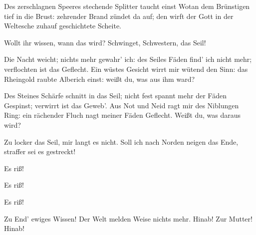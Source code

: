 \begin{drama}

Des zerschlagnen Speeres
stechende Splitter
taucht einst Wotan
dem Brünstigen tief in die Brust:
zehrender Brand zündet da auf;
den wirft der Gott in der Weltesche
zuhauf geschichtete Scheite.
 




\DieZweiteNornspeaks

Wollt ihr wissen,
wann das wird?
Schwinget, Schwestern, das Seil!
 

\DieErsteNornspeaks



Die Nacht weicht;
nichts mehr gewahr' ich:
des Seiles Fäden find' ich nicht mehr;
verflochten ist das Geflecht.
Ein wüstes Gesicht wirrt mir wütend den Sinn:
das Rheingold raubte Alberich einst:
weißt du, was aus ihm ward?
 

\DieZweiteNornspeaks



Des Steines Schärfe schnitt in das Seil;
nicht fest spannt mehr der Fäden Gespinst;
verwirrt ist das Geweb'.
Aus Not und Neid
ragt mir des Niblungen Ring:
ein rächender Fluch
nagt meiner Fäden Geflecht.
Weißt du, was daraus wird?
 

\DieDritteNornspeaks



Zu locker das Seil, mir langt es nicht.
Soll ich nach Norden neigen das Ende,
straffer sei es gestreckt!


Es riß!
 

\DieZweiteNornspeaks

Es riß!
 

\DieErsteNornspeaks

Es riß!
 




Zu End' ewiges Wissen!
Der Welt melden Weise nichts mehr.
Hinab! Zur Mutter! Hinab!
 



\end{drama}
